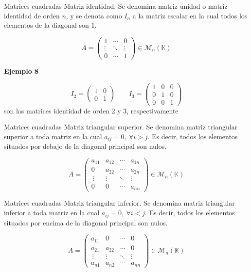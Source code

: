 \documentclass[
  ignorenonframetext,
]{beamer}
\begin{document}
\begin{frame}{Matrices cuadradas}
\protect\hypertarget{matrices-cuadradas-3}{}
Matriz identidad. Se denomina matriz unidad o matriz identidad de orden
\(n\), y se denota como \(I_n\) a la matriz escalar en la cual todos los
elementos de la diagonal son \(1\).

\[A = \begin{pmatrix}1&\cdots&0\\ \vdots & \ddots& \vdots\\0&\cdots&1\end{pmatrix}\in\mathcal{M}_n(\mathbb{K})\]

\textbf{Ejemplo 8}

\[I_2=\begin{pmatrix}1&0\\0&1\end{pmatrix}\qquad I_3 = \begin{pmatrix}1&0&0\\0&1&0\\0&0&1\end{pmatrix}\]
son las matrices identidad de orden 2 y 3, respectivamente
\end{frame}

\begin{frame}{Matrices cuadradas}
\protect\hypertarget{matrices-cuadradas-4}{}
Matriz triangular superior. Se denomina matriz triangular superior a
toda matriz en la cual \(a_{ij}=0,\ \forall i>j\). Es decir, todos los
elementos situados por debajo de la diagonal principal son nulos.

\[A = \begin{pmatrix}a_{11}&a_{12}&\cdots&a_{1n}\\0&a_{22}&\cdots&a_{2n}\\\ \vdots & \vdots & \ddots& \vdots\\0&0&\cdots&a_{nn}\end{pmatrix}\in\mathcal{M}_n(\mathbb{K})\]
\end{frame}

\begin{frame}{Matrices cuadradas}
\protect\hypertarget{matrices-cuadradas-5}{}
Matriz triangular inferior. Se denomina matriz triangular inferior a
toda matriz en la cual \(a_{ij}=0,\ \forall i<j\). Es decir, todos los
elementos situados por encima de la diagonal principal son nulos.

\[A = \begin{pmatrix}a_{11}&0&\cdots&0\\a_{21}&a_{22}&\cdots&0\\\ \vdots & \vdots & \ddots& \vdots\\a_{n1}&a_{n2}&\cdots&a_{nn}\end{pmatrix}\in\mathcal{M}_n(\mathbb{K})\]
\end{frame}
\end{document}
